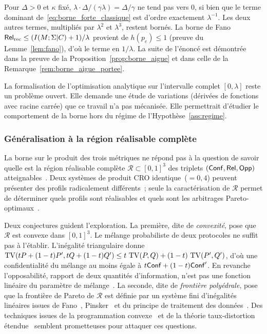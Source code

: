\begin{sloppypar}
\begin{Preuve}
Pour $\Delta > 0$ et $\kappa$ fix\'e, $\lambda \cdot \Delta/(\gamma\lambda) = \Delta/\gamma$ ne
tend pas vers $0$, si bien que le terme dominant de~\eqref{eq:borne_forte_classique}
est d'ordre exactement $\lambda^{-1}$. Les deux autres termes, multipli\'es par
$\lambda^2$ et $\lambda^3$, restent born\'es. La borne de Fano
$\mathsf{Rel}_{\mathrm{rec}} \leq (I(M;\Sigma|C)+1)/\lambda$ provient de $h(p_e) \leq 1$
(preuve du Lemme~\ref{lem:fano}), d'o\`u le terme en $1/\lambda$. La suite de
l'\'enonc\'e est d\'emontr\'ee dans la preuve de la Proposition~\ref{prop:borne_aigue} et
dans celle de la Remarque~\ref{rem:borne_aigue_portee}.
\end{Preuve}

La formalisation de l'optimisation analytique sur l'intervalle complet
$[0, \lambda]$ reste un probl\`eme ouvert. Elle demande une \'etude de variations
(d\'eriv\'ees de fonctions avec racine carr\'ee) que ce travail n'a pas
m\'ecanis\'ee. Elle permettrait d'\'etudier le comportement de la
borne hors du r\'egime de l'Hypoth\`ese~\ref{ass:regime}.

\subsubsection{G\'en\'eralisation \`a la r\'egion r\'ealisable compl\`ete}
\label{subsubsec:region_realisable}

La borne sur le produit des trois m\'etriques ne r\'epond pas \`a la question
de savoir quelle est la r\'egion r\'ealisable compl\`ete
$\mathcal{R} \subset [0,1]^3$ des triplets $(\mathsf{Conf}, \mathsf{Rel}, \mathsf{Opp})$
atteignables~\cite{MINKA2026CLO}. Deux syst\`emes de produit CRO
identique~($= 0{,}4$) peuvent pr\'esenter des profils radicalement
diff\'erents~; seule la caract\'erisation de $\mathcal{R}$ permet de
d\'eterminer quels profils sont r\'ealisables et quels sont les arbitrages
Pareto-optimaux~\cite{Boyd2004}.

Deux conjectures guident l'exploration. La premi\`ere, dite de \emph{convexit\'e}, pose que $\mathcal{R}$
est convexe dans $[0,1]^3$. Le m\'elange probabiliste de deux protocoles ne suffit pas \`a
l'\'etablir. L'in\'egalit\'e triangulaire donne
$\operatorname{TV}(tP+(1-t)P', tQ+(1-t)Q') \leq t\,\operatorname{TV}(P,Q) + (1-t)\,\operatorname{TV}(P',Q')$, d'o\`u une
confidentialit\'e du m\'elange au moins \'egale \`a $t\mathsf{Conf} + (1-t)\mathsf{Conf}'$. En revanche
l'opposabilit\'e, rapport de deux quantit\'es d'information, n'est pas une fonction
lin\'eaire du param\`etre de m\'elange~\cite{MINKA2026CLO}.
La seconde, dite de \emph{fronti\`ere poly\'edrale}, pose que la fronti\`ere de Pareto de $\mathcal{R}$
est d\'efinie par un syst\`eme fini d'in\'egalit\'es lin\'eaires issues de
Fano~\cite{Fano61}, Pinsker~\cite{Pinsker1964} et du principe de traitement
des donn\'ees~\cite{CoverThomas06}. Des techniques issues de la programmation
convexe~\cite{Boyd2004,Nesterov2018} et de la th\'eorie taux-distortion
\'etendue~\cite{Berger71,Gray2011} semblent prometteuses pour attaquer ces
questions.


\end{sloppypar}
